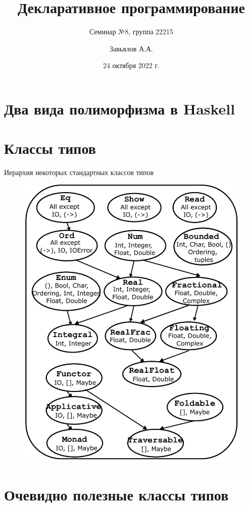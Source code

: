 \documentclass{beamer}
\title{Декларативное программирование}
\subtitle{Семинар №8, группа 22215}
\author{Завьялов А.А.}
\date{24 октября 2022 г.}
\institute{Кафедра систем информатики ФИТ НГУ}
\begin{document}
  \maketitle
  \section{Два вида полиморфизма в Haskell}
  \section{Классы типов}
  \begin{frame}{Иерархия некоторых стандартных классов типов}
      \begin{figure}
          \centering
          \includegraphics[scale=0.45]{media/base-classes.pdf}
      \end{figure}
  \end{frame}
  \section{Очевидно полезные классы типов}
\end{document}

